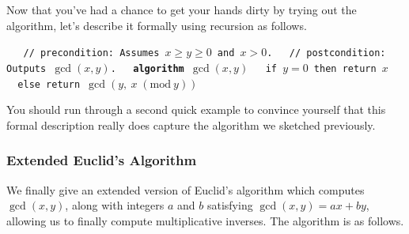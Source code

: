 \documentclass[11pt]{article}
\newcounter{thm}
\begin{document}

Now that you've had a chance to get your hands dirty by trying out the algorithm, let's describe it formally using recursion as follows.

{\obeylines \tt
~~// precondition: Assumes $x \geq y \geq 0$ and $x>0$.
~~// postcondition: Outputs $\gcd(x,y)$.
~~{\bf algorithm} $\gcd(x,y)$
~~\quad if $y = 0$ then return $x$
~~\quad else return $\gcd(y, \: x \; (\text{mod}~y))$}
~~\par\smallskip\noindent

You should run through a second quick example to convince yourself that this formal description really does capture the algorithm we sketched previously.

\subsubsection{Extended Euclid's Algorithm}
We finally give an extended version of Euclid's algorithm which computes $\gcd(x,y)$, along with integers $a$ and $b$ satisfying $\gcd(x,y) = ax+by$, allowing us to finally compute multiplicative inverses. The algorithm is as follows.
\end{document}
